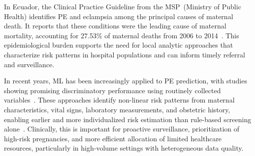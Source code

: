 \documentclass[diagnostics,article,accept,pdftex,moreauthors]{Definitions/mdpi}
\begin{document}
In Ecuador, the Clinical Practice Guideline from the
\ac{MSP}~{(Ministry of Public Health)} %
 identifies
\ac{PE} and eclampsia among the principal causes of maternal
death. It reports that these conditions were the leading cause of
maternal mortality, accounting for 27.53\% of maternal deaths from
2006 to 2014~\cite{msp_ecuador_hdp_2013}. This epidemiological burden
supports the need for local analytic approaches that characterize risk
patterns in hospital populations and can inform timely referral and
surveillance.

In recent years, \ac{ML} has been increasingly applied to \ac{PE}
prediction, with studies showing promising discriminatory performance
using routinely collected variables~\cite{LI2021102,mennickent_2023,Darsareh2024,Rahman2023}.
These approaches identify non-linear risk patterns from maternal
characteristics, vital signs, laboratory measurements, and obstetric
history, enabling earlier and more individualized risk estimation than
rule-based screening alone~\cite{LI2021102,mennickent_2023}. Clinically,
this is important for proactive surveillance, prioritization of
high-risk pregnancies, and more efficient allocation of limited
healthcare resources, particularly in high-volume settings with
heterogeneous data quality.
\end{document}
